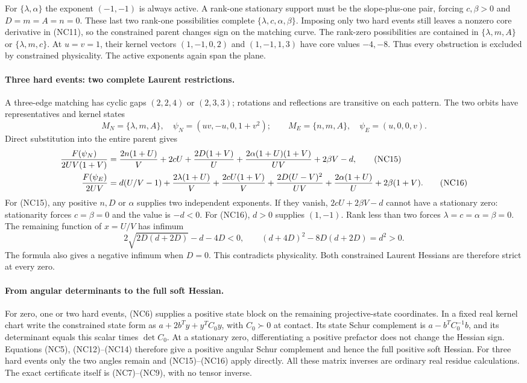 For $\{\lambda,\alpha\}$ the exponent $(-1,-1)$ is always active.
A rank-one stationary support must be the slope-plus-one pair,
forcing $c,\beta>0$ and $D=m=A=n=0$. These last two rank-one
possibilities complete $\{\lambda,c,\alpha,\beta\}$. Imposing
only two hard events still leaves a nonzero core derivative in
(NC11), so the constrained parent changes sign on the matching
curve. The rank-zero possibilities are contained in
$\{\lambda,m,A\}$ or $\{\lambda,m,c\}$. At $u=v=1$, their kernel
vectors $(1,-1,0,2)$ and $(1,-1,1,3)$ have core values $-4,-8$.
Thus every obstruction is excluded by constrained physicality.
The active exponents again span the plane.

\paragraph{Three hard events: two complete Laurent restrictions.}
A three-edge matching has cyclic gaps $(2,2,4)$ or $(2,3,3)$;
rotations and reflections are transitive on each pattern. The two
orbits have representatives and kernel states
\[
 M_N=\{\lambda,m,A\},\quad\psi_N=(uv,-u,0,1+v^2);
 \qquad
 M_E=\{n,m,A\},\quad\psi_E=(u,0,0,v).
\]
Direct substitution into the entire parent gives
\begin{align}
 {F(\psi_N)\over2UV(1+V)}
 ={}&{2n(1+U)\over V}+2cU+{2D(1+V)\over U}
       +{2\alpha(1+U)(1+V)\over UV}+2\beta V-d,
                                                        \tag{NC15}\\
 {F(\psi_E)\over2UV}
 ={}&d(U/V-1)+{2\lambda(1+U)\over V}
       +{2cU(1+V)\over V}+{2D(U-V)^2\over UV}
       +{2\alpha(1+U)\over U}+2\beta(1+V).            \tag{NC16}
\end{align}
For (NC15), any positive $n,D$ or $\alpha$ supplies two independent
exponents. If they vanish, $2cU+2\beta V-d$ cannot have a stationary
zero: stationarity forces $c=\beta=0$ and the value is $-d<0$.
For (NC16), $d>0$ supplies $(1,-1)$. Rank less than two forces
$\lambda=c=\alpha=\beta=0$. The remaining function of $x=U/V$
has infimum
\[
 2\sqrt{2D(d+2D)}-d-4D<0,
 \qquad (d+4D)^2-8D(d+2D)=d^2>0.
\]
The formula also gives a negative infimum when $D=0$. This contradicts
physicality. Both constrained Laurent Hessians are therefore strict
at every zero.

\paragraph{From angular determinants to the full soft Hessian.}
For zero, one or two hard events, (NC6) supplies a positive state
block on the remaining projective-state coordinates. In a fixed real
kernel chart write the constrained state form as
$a+2b^Ty+y^TC_0y$, with $C_0\succ0$ at contact. Its state Schur
complement is $a-b^TC_0^{-1}b$, and its determinant equals this
scalar times $\det C_0$. At a stationary zero, differentiating a
positive prefactor does not change the Hessian sign. Equations
(NC5), (NC12)--(NC14) therefore give a positive angular Schur
complement and hence the full positive soft Hessian. For three hard
events only the two angles remain and (NC15)--(NC16) apply directly.
All these matrix inverses are ordinary real residue calculations.
The exact certificate itself is (NC7)--(NC9), with no tensor inverse.

